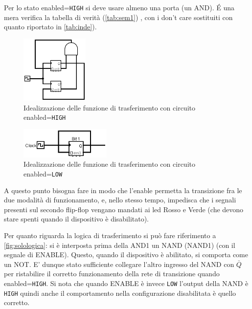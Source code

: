 \documentclass[a4paper,10pt]{article}
\def\code#1{\texttt{#1}}
\begin{document}
Per lo stato enabled=\code{HIGH} si deve usare almeno una porta (un AND). 
\'E una mera verifica la tabella di verità (\cref{tab:sem1}) , con i don't care sostituiti con quanto riportato in \cref{tab:inde}).



\begin{figure}[H]
	\centering
	\includegraphics[width=0.3\textwidth]{../grafici/enabled.png}
	\caption{Idealizzazione delle funzione di trasferimento con circuito enabled=\code{HIGH}}
	\label{fig:enabled}
\end{figure}


\begin{figure}[H]
	\centering
	\includegraphics[width=0.4\textwidth]{../grafici/disabled1.png}
	\caption{Idealizzazione delle funzione di trasferimento con circuito enabled=\code{LOW}}
	\label{fig:disabled}
\end{figure}

A questo punto bisogna fare in modo che l'enable permetta la transizione fra le due modalità di funzionamento, e, nello stesso tempo, impedisca che i segnali presenti sul secondo flip-flop vengano mandati ai led Rosso e Verde (che devono stare spenti quando il dispositivo è disabilitato).

Per quanto riguarda la logica di trasferimento si può fare riferimento a \cref{fig:solologica}: si è interposta prima della AND1 un NAND (NAND1) (con il segnale di ENABLE). Questo, quando il dispositivo è abilitato, si comporta come un NOT. E' dunque stato sufficiente collegare l'altro ingresso del NAND con $\bar{Q}$ per ristabilire il corretto funzionamento della rete di transizione quando enabled=\code{HIGH}.
Si nota che quando ENABLE è invece \code{LOW} l'output della NAND è \code{HIGH} quindi anche il comportamento nella configurazione disabilitata è quello corretto.
\newline
\end{document}
